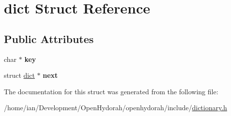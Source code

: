\hypertarget{structdict}{\section{dict Struct Reference}
\label{structdict}
}
\subsection*{Public Attributes}
\begin{DoxyCompactItemize}
\item 
\hypertarget{structdict_a91ef372fe4b6e72856913298d1e38695}{char $\ast$ {\bfseries key}}\label{structdict_a91ef372fe4b6e72856913298d1e38695}

\item 
\hypertarget{structdict_a9a616375f3cc6baf3f7cb14c685f0c89}{struct \hyperlink{structdict}{dict} $\ast$ {\bfseries next}}\label{structdict_a9a616375f3cc6baf3f7cb14c685f0c89}

\end{DoxyCompactItemize}


The documentation for this struct was generated from the following file\-:\begin{DoxyCompactItemize}
\item 
/home/ian/\-Development/\-Open\-Hydorah/openhydorah/include/\hyperlink{dictionary_8h}{dictionary.\-h}\end{DoxyCompactItemize}
